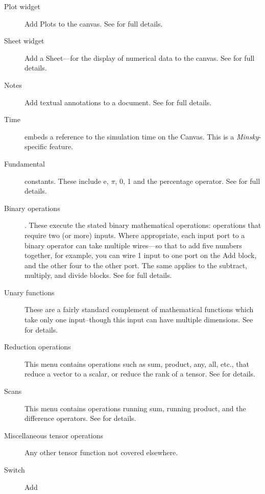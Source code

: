 \begin{description}
\item [{Plot widget}]  Add Plots to the canvas.
See  for full details.
\item [{Sheet widget}]  Add a Sheet---for the
display of numerical data to the canvas. See  for full
details.
\item [{Notes}] Add textual annotations to a document. See 
for full details.
\item [{Time}]  embeds a reference to the simulation
time on the Canvas. This is a \emph{Minsky}-specific feature.
\item [{Fundamental}] constants. These include e, $\pi$, 0, 1 and the
percentage operator. See  for full details.
\item [{Binary operations}] . These execute
the stated binary mathematical operations: operations that require
two (or more) inputs. Where appropriate, each input port to a binary
operator can take multiple wires---so that to add five numbers together,
for example, you can wire 1 input to one port on the Add block, and
the other four to the other port. The same applies to the subtract,
multiply, and divide blocks. See  for full
details.
\item [{Unary functions}]  These are a fairly standard
complement of mathematical functions which take only one input--though
this input can have multiple dimensions. See 
for details.
\item [{Reduction operations}]  This menu contains
operations such as sum, product, any, all, etc., that reduce a vector
to a scalar, or reduce the rank of a tensor. See 
for details.
\item [{Scans}]  This menu contains operations
running sum, running product, and the difference operators. See 
for details.
\item [{Miscellaneous tensor operations}] 
Any other tensor function not covered elsewhere.
\item [{Switch}]  Add 
\end{description}
